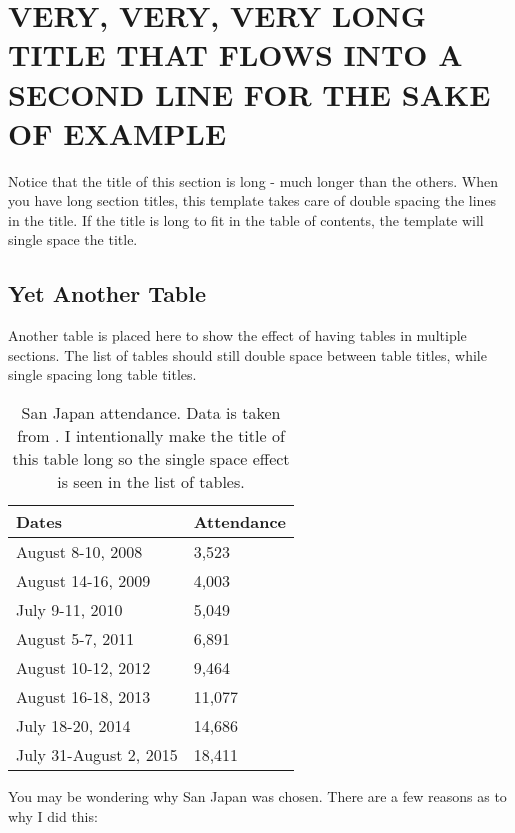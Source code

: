 

\chapter{VERY, VERY, VERY LONG TITLE THAT FLOWS INTO A SECOND LINE FOR THE SAKE OF EXAMPLE}

Notice that the title of this section is long - much longer than the others. When you have long section titles, this template takes care of double spacing the lines in the title. If the title is long to fit in the table of contents, the template will single space the title.

\section{Yet Another Table}

Another table is placed here to show the effect of having tables in multiple sections. The list of tables should still double space between table titles, while single spacing long table titles.

\begin{table}[h!]
	\centering
	\begin{tabular}{|l|l|}
		\hline
		Dates & Attendance  \\ \hline
		August 8-10, 2008 & 3,523  \\ \hline
		August 14-16, 2009 & 4,003 \\ \hline
		July 9-11, 2010 & 5,049 \\ \hline
		August 5-7, 2011 & 6,891  \\ \hline
		August 10-12, 2012 & 9,464  \\ \hline
		August 16-18, 2013 & 11,077  \\ \hline
		July 18-20, 2014 & 14,686 \\ \hline
		July 31-August 2, 2015 & 18,411  \\ \hline
	\end{tabular}
	\caption{San Japan attendance. Data is taken from \cite{ANCONS}. I intentionally make the title of this table long so the single space effect is seen in the list of tables.}
\end{table}

You may be wondering why San Japan was chosen. There are a few reasons as to why I did this:

